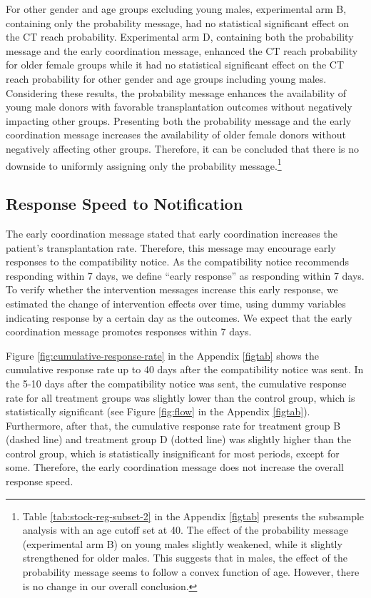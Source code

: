 \documentclass[12pt, a4paper]{article}
\begin{document}
For other gender and age groups excluding young males, experimental arm B, containing only the probability message, had no statistical significant effect on the CT reach probability. Experimental arm D, containing both the probability message and the early coordination message, enhanced the CT reach probability for older female groups while it had no statistical significant effect on the CT reach probability for other gender and age groups including young males. Considering these results, the probability message enhances the availability of young male donors with favorable transplantation outcomes without negatively impacting other groups. Presenting both the probability message and the early coordination message increases the availability of older female donors without negatively affecting other groups. Therefore, it can be concluded that there is no downside to uniformly assigning only the probability message.\footnote{Table \ref{tab:stock-reg-subset-2} in the Appendix \ref{figtab} presents the subsample analysis with an age cutoff set at 40. The effect of the probability message (experimental arm B) on young males slightly weakened, while it slightly strengthened for older males. This suggests that in males, the effect of the probability message seems to follow a convex function of age. However, there is no change in our overall conclusion.}

\hypertarget{reply-speed}{%
\subsection{Response Speed to Notification}\label{reply-speed}}

The early coordination message stated that early coordination increases the patient's transplantation rate. Therefore, this message may encourage early responses to the compatibility notice. As the compatibility notice recommends responding within 7 days, we define ``early response'' as responding within 7 days. To verify whether the intervention messages increase this early response, we estimated the change of intervention effects over time, using dummy variables indicating response by a certain day as the outcomes. We expect that the early coordination message promotes responses within 7 days.

Figure \ref{fig:cumulative-response-rate} in the Appendix \ref{figtab} shows the cumulative response rate up to 40 days after the compatibility notice was sent. In the 5-10 days after the compatibility notice was sent, the cumulative response rate for all treatment groups was slightly lower than the control group, which is statistically significant (see Figure \ref{fig:flow} in the Appendix \ref{figtab}). Furthermore, after that, the cumulative response rate for treatment group B (dashed line) and treatment group D (dotted line) was slightly higher than the control group, which is statistically insignificant for most periods, except for some. Therefore, the early coordination message does not increase the overall response speed.
\end{document}
